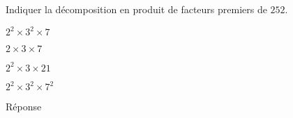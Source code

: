 \begin{exercice}
    Indiquer la décomposition en produit de facteurs premiers de $252$.
    \begin{ChoixQCM}{2}
        \item $2^2\times 3^2\times 7$
        \item $2\times 3\times 7$
        \item $2^2\times 3\times 21$
        \item $2^2\times 3^2\times 7^2$
    \end{ChoixQCM}
\end{exercice}
\begin{corrige}
    Réponse  
\end{corrige}